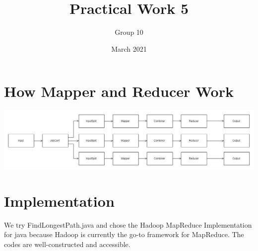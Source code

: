 \documentclass{article}
\title{Practical Work 5}
\author{Group 10}
\date{March 2021}
\begin{document}
\maketitle

\section{How Mapper and Reducer Work}
   
    \includegraphics[scale=0.3]{FindPath.jpg}

\section{Implementation}
We try FindLongestPath.java and chose the Hadoop MapReduce Implementation for java because Hadoop is currently the go-to framework for MapReduce. The codes are well-constructed and accessible.
\end{document}
